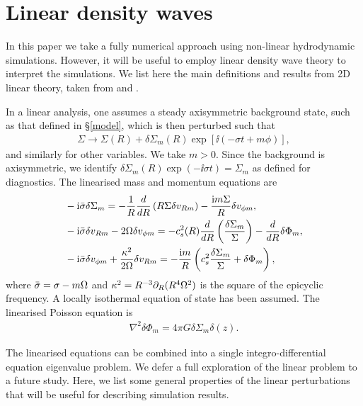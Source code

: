 \section{Linear density waves}\label{wkb}
In this paper we take a fully numerical approach using non-linear
hydrodynamic simulations. However, it will be useful to employ
linear density wave theory to interpret the simulations.
We list here the main definitions and results from 2D linear theory,
taken from \cite{lin11b} and \cite{shu91}.  

In a linear analysis, one assumes a steady axisymmetric background state, such as
that defined in \S\ref{model}, which is then perturbed such that
\begin{align}  
  \Sigma \to \Sigma(R) + \delta\Sigma_m(R)\exp{\left[\ii\left(-\sigma t +
        m\phi\right)\right]}, 
\end{align}
and similarly for other variables. We take $m>0$. Since the background is
axisymmetric, we identify $\delta\Sigma_m(R)\exp{\left(-\ii\sigma
    t\right)} = \Sigma_m$ as defined for diagnostics. 
The linearised mass and momentum equations are
\begin{align}
  &-\mathrm{i}\bar{\sigma} \delta\Sigma_m = -\frac{1}{R}\frac{d}{dR}\left(R\Sigma\delta
    v_{Rm}\right) - \frac{\mathrm{i} m \Sigma}{R}\delta v_{\phi m}, \\
  &-\mathrm{i}\bar{\sigma}\delta v_{Rm} - 2\Omega \delta v_{\phi m} = -
  c_s^2(R)\frac{d}{dR}\left(\frac{\delta\Sigma_m}{\Sigma}\right) - \frac{d}{dR}\delta\Phi_m,\\
  & -\mathrm{i}\bar{\sigma}\delta v_{\phi m} + \frac{\kappa^2}{2\Omega}\delta v_{Rm} =
  -\frac{\mathrm{i} m }{R}\left(c_s^2\frac{\delta\Sigma_m}{\Sigma} + \delta\Phi_m\right),
\end{align}
where $\bar{\sigma} = \sigma - m\Omega$ and $\kappa^2 =
R^{-3}\partial_R(R^4\Omega^2)$ is the square of the epicyclic frequency. A
locally isothermal equation of state has been assumed.    
The linearised Poisson equation is 
\begin{align}
  \nabla^2\delta\Phi_m = 4\pi G \delta\Sigma_m \delta(z). 
\end{align}

The linearised equations can be combined into a single
integro-differential equation eigenvalue problem. We defer a full
exploration of the linear problem to a future study. Here, we list some
general  properties of the linear perturbations that will be useful
for describing simulation results. 

